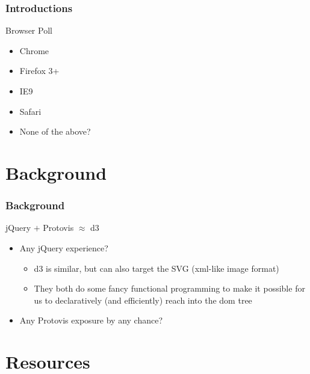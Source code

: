 \documentclass{beamer}
\begin{document}
\begin{frame}
    \frametitle{Introductions}
\pause
    \begin{block}{Browser Poll}
        \begin{itemize}
\pause
        \item Chrome
\pause
        \item Firefox 3+
\pause
        \item IE9
\pause
        \item Safari
\pause
        \item None of the above?
        \end{itemize}
    \end{block}
\end{frame}


\section{Background}

\begin{frame}
    \frametitle{Background}
    \begin{block}{jQuery $+$ Protovis $\approx$ d3}
\pause
        \begin{itemize}
        \item Any jQuery experience?
\pause
            \begin{itemize}
            \item d3 is similar, but can also target the SVG (xml-like image format)
\pause
            \item They both do some fancy functional programming to make it possible 
                  for us to declaratively (and efficiently) reach into the dom tree
            \end{itemize}
\pause
       \item Any Protovis exposure by any chance?
       \end{itemize}
    \end{block}
\end{frame}


\section{Resources}
\end{document}
